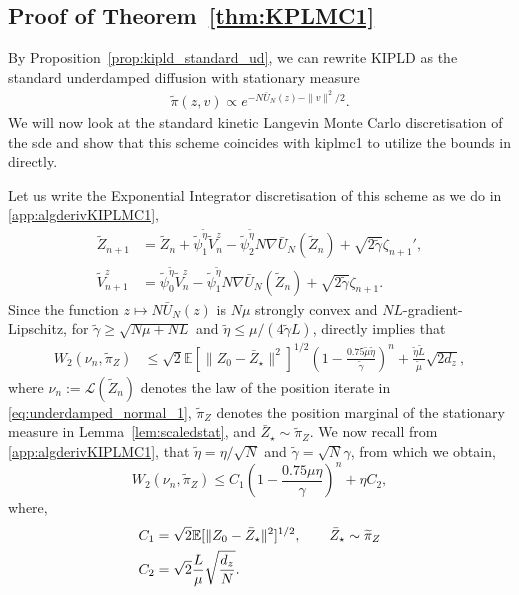 \subsection{Proof of Theorem~\ref{thm:KPLMC1}}\label{app:proofnumericalKPLMC1}
By Proposition~\ref{prop:kipld_standard_ud}, we can rewrite KIPLD as the standard underdamped diffusion with stationary measure
\begin{align*}
\widetilde{\pi}(z, v) \propto e^{-N \bar{U}_N(z) - \|v\|^2/2}.
\end{align*}
We will now look at the standard kinetic Langevin Monte Carlo discretisation of the \gls*{sde} and show that this scheme coincides with \gls*{kiplmc1} to utilize the bounds in \citep{dalalyan2018sampling} directly.

Let us write the Exponential Integrator discretisation of this scheme as we do in \ref{app:algderivKIPLMC1},
\small
\begin{equation}\label{eq:underdamped_normal_1}
\begin{aligned}
\widetilde{Z}_{n+1} &= \widetilde{Z}_{n} + \widetilde{\psi}_1^{\tilde{\eta}} \widetilde{V}_n^z - \widetilde{\psi}_2^{\tilde{\eta}} N \nabla \bar{U}_N(\widetilde{Z}_n)+ \sqrt{2 \tilde{\gamma}} \zeta_{n+1}',\\
\widetilde{V}_{n+1}^z &= \widetilde{\psi}_0^{\tilde{\eta}} \widetilde{V}_n^z - \widetilde{\psi}_1^{\tilde{\eta}} N \nabla \bar{U}_N(\widetilde{Z}_n) + \sqrt{2 \tilde{\gamma}} \zeta_{n+1}. \end{aligned}
\end{equation}
\normalsize
Since the function $z \mapsto N \bar{U}_N(z)$ is $N\mu$ strongly convex and $NL$-gradient-Lipschitz, for $\tilde{\gamma} \geq \sqrt{N\mu + N L}$ and $\tilde{\eta} \leq \mu / (4 \tilde{\gamma} L)$, \citep[Theorem~2]{dalalyan2018sampling} directly implies that
\small
\begin{align*}
W_2(\nu_n, \widetilde\pi_Z) &\leq \sqrt{2} \mathbb{E}[\|Z_0-\bar{Z}_\star\|^2]^{1/2} \left( 1 - \frac{0.75 \tilde{\mu} \tilde{\eta}}{\tilde{\gamma}}\right)^n + \frac{\tilde{\eta}\tilde{L}}{\tilde{\mu}}\sqrt{2d_z},
\end{align*}
\normalsize
where $\nu_n:=\mathcal L(\widetilde Z_n)$ denotes the law of the position iterate in \eqref{eq:underdamped_normal_1}, $\widetilde\pi_Z$ denotes the position marginal of the stationary measure in Lemma~\ref{lem:scaledstat}, and $\bar Z_\star\sim\widetilde\pi_Z$. We now recall from \ref{app:algderivKIPLMC1}, that $\tilde{\eta}=\eta/\sqrt{N}$ and $\tilde{\gamma}=\sqrt{N}\gamma$, from which we obtain,
\small
\begin{equation*}
W_2(\nu_n, \widetilde\pi_Z) \leq C_1\left(1-\frac{0.75 \mu\eta}{\gamma}\right)^n + \eta C_2,
\end{equation*}
\normalsize
where,
\small
\begin{align*}
C_1&= \sqrt{2} {\mathbb E}[\|Z_0-\bar{Z}_\star\|^2]^{1/2}, \qquad \bar{Z}_\star\sim \widetilde\pi_Z\\
C_2&=\sqrt{2}\frac{L}{\mu} \sqrt{\frac{d_z}{N}}.
\end{align*}
\normalsize

